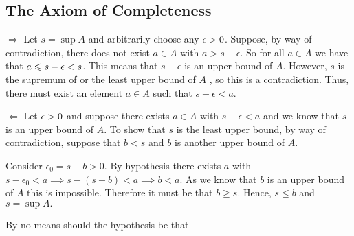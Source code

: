 \documentclass{report}
\begin{document}
\subsection{The Axiom of Completeness}

\bigskip





\begin{myproof}
\par
$\Rightarrow$
Let  $s = \sup A$ and arbitrarily choose any $\epsilon >0$. Suppose, by way of contradiction, there does not exist $a \in A$ with $a > s- \epsilon$. So for all $a \in A$ we have that $ a \leqslant s - \epsilon < s$. This means that $s-\epsilon$ is an upper bound  of $A$. However, $s$ is  the supremum of or the least upper bound  of $A$ , so this is a contradiction. Thus, there must exist an element $a \in A$ such that $s- \epsilon <a.$

\par
$\Leftarrow$
Let $ \epsilon > 0$ and suppose  there exists $a \in A$ with $s-\epsilon < a$ and we know that $s$ is an upper bound  of $A$. To show that $s$ is the least upper bound, by way of contradiction, suppose that $b<s$ and $b$ is another upper bound of $A$.
\par 
Consider $\epsilon_{0} = s - b > 0.$ By hypothesis there exists $a$ with $s - \epsilon_{0} < a \implies s - (s - b) < a \implies  b < a.$ As we know that $b$ is an upper bound of $A$ this is impossible. Therefore it must be that $b \geq s$. Hence, $s \leq b$ and $s = \sup A.$
\end{myproof}

By no means should the hypothesis be that 
\end{document}
